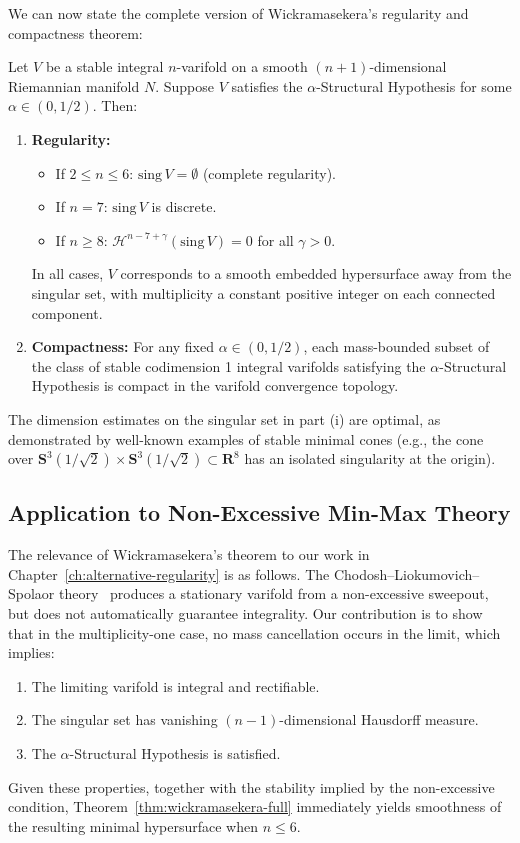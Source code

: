 We can now state the complete version of Wickramasekera's regularity and compactness theorem:

\begin{theorem}
\label{thm:wickramasekera-full}
Let $V$ be a stable integral $n$-varifold on a smooth $(n+1)$-dimensional Riemannian manifold $N$.
Suppose $V$ satisfies the $\alpha$-Structural Hypothesis for some $\alpha \in (0,1/2)$. Then:
\begin{enumerate}[label=(\roman*)]
\item \textbf{Regularity:}
\begin{itemize}
\item If $2 \leq n \leq 6$: $\mathrm{sing}\, V = \emptyset$ (complete regularity).
\item If $n = 7$: $\mathrm{sing}\, V$ is discrete.
\item If $n \geq 8$: ${\mathcal H}^{n-7+\gamma}(\mathrm{sing}\, V) = 0$ for all $\gamma > 0$.
\end{itemize}
In all cases, $V$ corresponds to a smooth embedded hypersurface away from the singular set, with
multiplicity a constant positive integer on each connected component.

\item \textbf{Compactness:} For any fixed $\alpha \in (0,1/2)$, each mass-bounded subset of the
class of stable codimension 1 integral varifolds satisfying the $\alpha$-Structural Hypothesis
is compact in the varifold convergence topology.
\end{enumerate}
\end{theorem}

The dimension estimates on the singular set in part (i) are optimal, as demonstrated by well-known
examples of stable minimal cones (e.g., the cone over
$\mathbf{S}^3(1/\sqrt{2}) \times \mathbf{S}^3(1/\sqrt{2}) \subset \mathbf{R}^8$ has an isolated
singularity at the origin).

\subsection{Application to Non-Excessive Min-Max Theory}

The relevance of Wickramasekera's theorem to our work in Chapter~\ref{ch:alternative-regularity} is as
follows. The Chodosh--Liokumovich--Spolaor theory~\cite{CLS22} produces a stationary varifold from
a non-excessive sweepout, but does not automatically guarantee integrality. Our contribution is to
show that in the multiplicity-one case, no mass cancellation occurs in the limit, which implies:
\begin{enumerate}[label=(\alph*)]
\item The limiting varifold is integral and rectifiable.
\item The singular set has vanishing $(n-1)$-dimensional Hausdorff measure.
\item The $\alpha$-Structural Hypothesis is satisfied.
\end{enumerate}
Given these properties, together with the stability implied by the non-excessive condition,
Theorem~\ref{thm:wickramasekera-full} immediately yields smoothness of the resulting minimal
hypersurface when $n \leq 6$.

